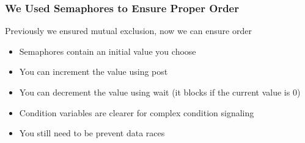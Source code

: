   \begin{frame}
    \frametitle{We Used Semaphores to Ensure Proper Order}

    Previously we ensured mutual exclusion, now we can ensure order

    \begin{itemize}
      \item Semaphores contain an initial value you choose
      \item You can increment the value using post
      \item You can decrement the value using wait (it blocks if the current
            value is 0)
      \item Condition variables are clearer for complex condition signaling
      \item You still need to be prevent data races
    \end{itemize}
  \end{frame}

